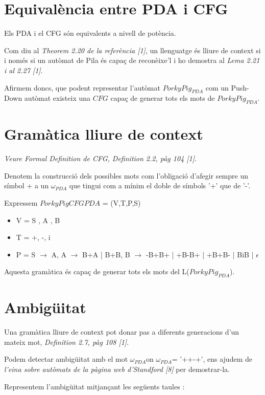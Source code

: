 \documentclass[12pt,a4paper]{report}
\def \wpda{$\omega_{PDA} $}
\def \pdaCFG{$PorkyPigCFG{PDA} $}
\def \pda{$PorkyPig_{PDA} $}
\begin{document}
\section{Equivalència entre PDA i CFG}

Els PDA i el CFG són equivalents a nivell de potència.

Com diu al \textit{Theorem 2.20 de la referència [1]}, un llenguatge és lliure de context si i només si un autòmat de Pila és capaç de reconèixe’l i ho demostra al \textit{Lema 2.21 i al 2.27 [1]}.

Afirmem doncs, que podent representar l’autòmat \pda{} com un Push-Down autòmat existeix una $CFG$ capaç de generar tots els mots de \pda{}.

\section{Gramàtica lliure de context}

\textit{Veure Formal Definition de CFG, Definition 2.2, pàg 104 [1]}.

Denotem la construcció dels possibles mots com l'obligació d’afegir sempre un símbol + a un \wpda{} que tingui com a mínim el doble de símbols '+' que de '-'.

Expressem \pdaCFG{} = (V,T,P,S)

\begin{itemize}
\item V  = {S , A , B}
\item T = {+, -, i }
\item P = {
		S $\rightarrow$ A,
		A $\rightarrow$ B+A | B+B,
		B $\rightarrow$ -B+B+ | +B-B+ | +B+B- | BiB | $\epsilon$
      }
\end{itemize}

Aquesta gramàtica és capaç de generar tots els mots del L(\pda{}).

\section{Ambigüitat}

Una gramàtica lliure de context pot donar pas a diferents generacions d’un mateix mot, \textit{Definition 2.7, pàg 108 [1]}.

Podem detectar ambigüitat amb el mot \wpda on \wpda = '++-+', ens ajudem de \textit{l'eina sobre autòmats de la pàgina web d'Standford [8]} per demostrar-la.

Representem l'ambigüitat mitjançant les següents taules :
\end{document}
